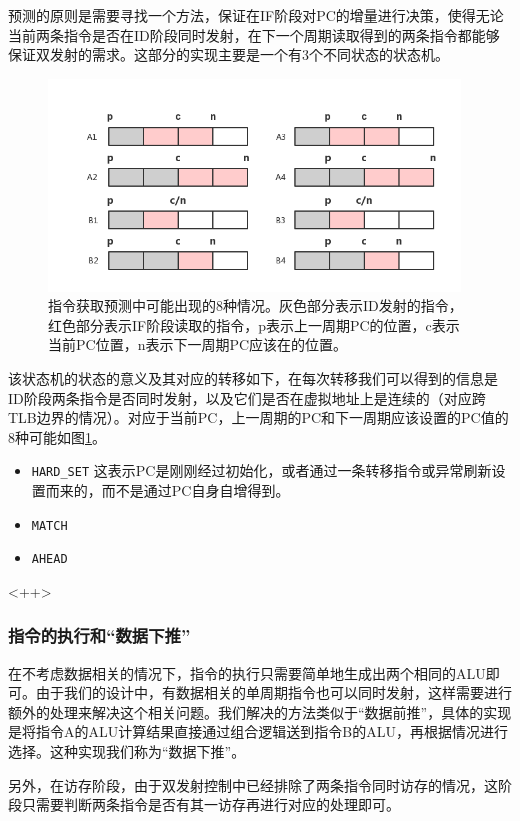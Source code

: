 预测的原则是需要寻找一个方法，保证在IF阶段对PC的增量进行决策，使得无论当前两条指令是否在ID阶段同时发射，在下一个周期读取得到的两条指令都能够保证双发射的需求。这部分的实现主要是一个有3个不同状态的状态机。

\begin{figure}[htbp]
	\centering
	\includegraphics[width=4.3in]{emit-prediction.png}
	\caption{指令获取预测中可能出现的8种情况。灰色部分表示ID发射的指令，红色部分表示IF阶段读取的指令，p表示上一周期PC的位置，c表示当前PC位置，n表示下一周期PC应该在的位置。}
	\label{fig:emit-prediction}
\end{figure}

该状态机的状态的意义及其对应的转移如下，在每次转移我们可以得到的信息是ID阶段两条指令是否同时发射，以及它们是否在虚拟地址上是连续的（对应跨TLB边界的情况）。对应于当前PC，上一周期的PC和下一周期应该设置的PC值的8种可能如图\ref{fig:emit-prediction}。
\begin{itemize}
	\item \texttt{HARD\_SET} 这表示PC是刚刚经过初始化，或者通过一条转移指令或异常刷新设置而来的，而不是通过PC自身自增得到。
	\item \texttt{MATCH}
	\item \texttt{AHEAD}
\end{itemize}<++>

\subsubsection{指令的执行和``数据下推''}
在不考虑数据相关的情况下，指令的执行只需要简单地生成出两个相同的ALU即可。由于我们的设计中，有数据相关的单周期指令也可以同时发射，这样需要进行额外的处理来解决这个相关问题。我们解决的方法类似于``数据前推''，具体的实现是将指令A的ALU计算结果直接通过组合逻辑送到指令B的ALU，再根据情况进行选择。这种实现我们称为``数据下推''。

另外，在访存阶段，由于双发射控制中已经排除了两条指令同时访存的情况，这阶段只需要判断两条指令是否有其一访存再进行对应的处理即可。

